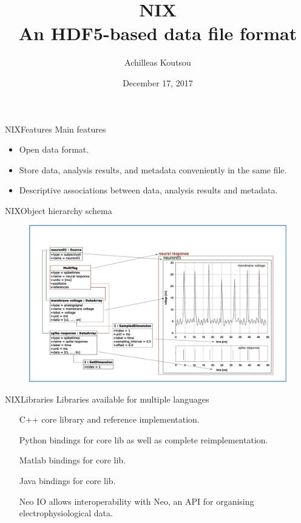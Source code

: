 \documentclass[10pt]{beamer}
\title[NIX]{NIX\\An HDF5-based data file format}
\author{Achilleas Koutsou}
\date{December 17, 2017}
\begin{document}
\maketitle

\begin{frame}{NIX}{Features}
    Main features

    \begin{itemize}
        \item Open data format.
        \item Store data, analysis results, and metadata conveniently in the same file.
        \item Descriptive associations between data, analysis results and metadata.
    \end{itemize}
\end{frame}

\begin{frame}{NIX}{Object hierarchy schema}
    \begin{figure}
        \includegraphics[width=\textwidth]{nix-model.pdf}
    \end{figure}
\end{frame}

\begin{frame}{NIX}{Libraries}
    Libraries available for multiple languages

    \begin{itemize}
        \item[C++] core library and reference implementation.
        \item[Python] bindings for core lib as well as complete reimplementation.
        \item[Matlab] bindings for core lib.
        \item[Java] bindings for core lib.
    \end{itemize}
    \begin{itemize}
        \item[Neo IO] allows interoperability with Neo, an API for organising electrophysiological data.
    \end{itemize}
\end{frame}
\end{document}
